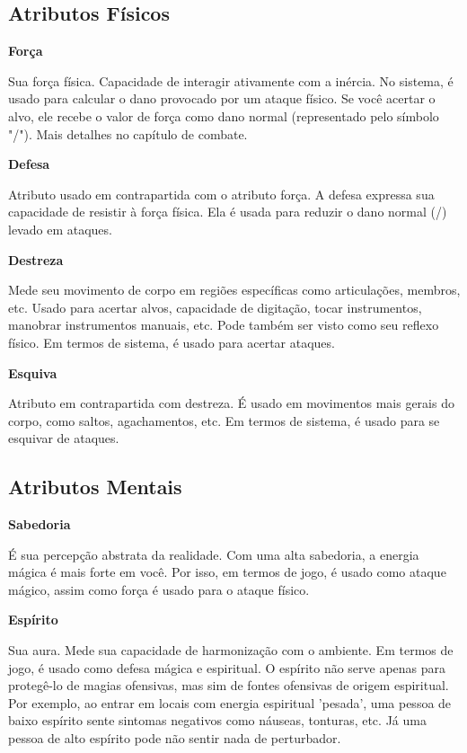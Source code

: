 \subsection{Atributos Físicos}

\textbf{Força}
 
Sua força física. Capacidade de interagir ativamente com a inércia. No sistema, é usado para calcular o dano provocado por um ataque físico. Se você acertar o alvo, ele recebe o valor de força como dano normal (representado pelo símbolo "/"). Mais detalhes no capítulo de combate.

\textbf{Defesa}

Atributo usado em contrapartida com o atributo força. A defesa expressa sua capacidade de resistir à força física. Ela é usada para reduzir o dano normal (/) levado em ataques. 

\textbf{Destreza}

Mede seu movimento de corpo em regiões específicas como articulações, membros, etc. Usado para acertar alvos, capacidade de digitação, tocar instrumentos, manobrar instrumentos manuais, etc. Pode também ser visto como seu reflexo físico. Em termos de sistema, é usado para acertar ataques.

\textbf{Esquiva}

Atributo em contrapartida com destreza. É usado em movimentos mais gerais do corpo, como saltos, agachamentos, etc. Em termos de sistema, é usado para se esquivar de ataques.

\subsection{Atributos Mentais}

\textbf{Sabedoria}

É sua percepção abstrata da realidade. Com uma alta sabedoria, a energia mágica é mais forte em você. Por isso, em termos de jogo, é usado como ataque mágico, assim como força é usado para o ataque físico. 

\textbf{Espírito}

Sua aura. Mede sua capacidade de harmonização com o ambiente. Em termos de jogo, é usado como defesa mágica e espiritual. O espírito não serve apenas para protegê-lo de magias ofensivas, mas sim de fontes ofensivas de origem espiritual. Por exemplo, ao entrar em locais com energia espiritual 'pesada', uma pessoa de baixo espírito sente sintomas negativos como náuseas, tonturas, etc. Já uma pessoa de alto espírito pode não sentir nada de perturbador.

